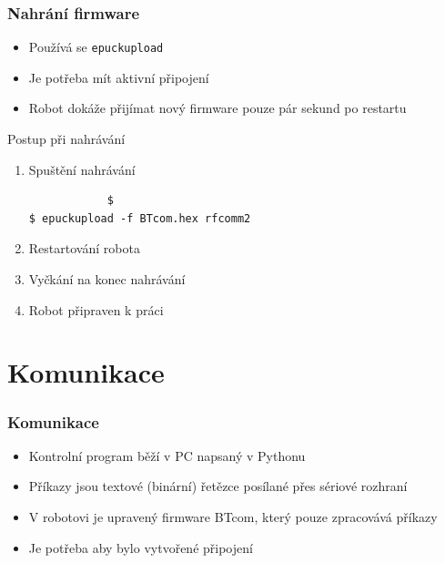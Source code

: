 \documentclass{beamer}
\begin{document}
\begin{frame}[fragile]
    \frametitle{Nahrání firmware}
    \begin{itemize}
        \item Používá se {\tt epuckupload}
        \item Je potřeba mít aktivní připojení
        \item Robot dokáže přijímat nový firmware pouze pár sekund po restartu
    \end{itemize}
    \begin{block}{Postup při nahrávání}
        \begin{enumerate}
            \item Spuštění nahrávání
\begin{verbatim}
            $
$ epuckupload -f BTcom.hex rfcomm2
\end{verbatim}

            \item Restartování robota
            \item Vyčkání na konec nahrávání
            \item Robot připraven k práci
        \end{enumerate}
    \end{block}

\end{frame}

\section{Komunikace}

\begin{frame}
    \frametitle{Komunikace}
    \begin{itemize}
    \item Kontrolní program běží v PC napsaný v Pythonu
    \item Příkazy jsou textové (binární) řetězce posílané přes sériové rozhraní
    \item V robotovi je upravený firmware BTcom, který pouze zpracovává příkazy
    \item Je potřeba aby bylo vytvořené připojení
    \end{itemize}
\end{frame}
\end{document}
